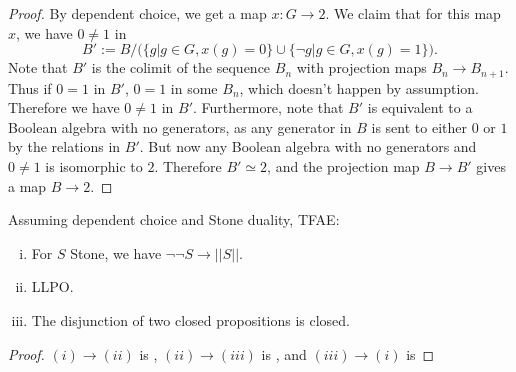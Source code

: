 \begin{proof}
  By dependent choice, we get a map $x:G\to 2$. 
  We claim that for this map $x$, we have $0\neq 1$ in 
  \begin{equation}
    B' := B/\big( \{g|g\in G, x(g) = 0\} \cup \{ \neg g| g\in G, x(g) = 1\}\big).
  \end{equation}
  Note that $B'$ is the colimit of the sequence $B_n$ with projection maps $B_n \to B_{n+1}$. 
  Thus if $0=1$ in $B'$, $0=1$ in some $B_n$, which doesn't happen by assumption. 
  Therefore we have $0\neq 1$ in $B'$. 
  Furthermore, note that $B'$ is equivalent to a Boolean algebra with no generators, 
  as any generator in $B$ is sent to either $0$ or $1$ by the relations in $B'$. 
%
  But now any Boolean algebra with no generators and $0\neq 1$ is isomorphic to $2$. 
  Therefore $B'\simeq 2$, and the projection map $B\to B'$ gives a map $B \to 2$. 
  
\end{proof}

\begin{corollary}
Assuming dependent choice and Stone duality, TFAE:
\begin{enumerate}[(i)]
  \item For $S$ Stone, we have $\neg \neg S \to ||S||$. 
  \item LLPO.
  \item The disjunction of two closed propositions is closed. 
\end{enumerate}
\end{corollary}
\begin{proof}
  $(i) \to (ii)$ is , $(ii) \to (iii)$ is , 
  and $(iii) \to (i)$ is 
\end{proof}
